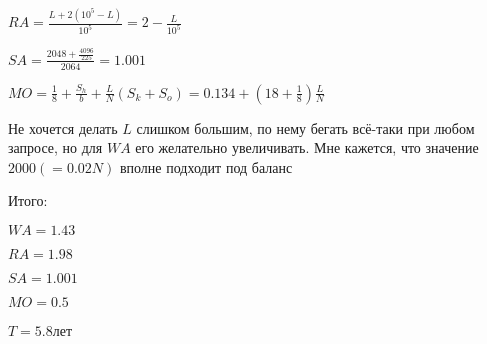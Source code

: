 \large$RA = \frac{L + 2(10^5-L)}{10^5} = 2 - \frac{L}{10^5}$\normalsize

\large$SA = \frac{2048 + \frac{4096}{225}}{2064} = 1.001$\normalsize

\large$MO = \frac{1}{8} + \frac{S_h}{b} + \frac{L}{N}(S_k + S_o) = 0.134 + (18+\frac{1}{8})\frac{L}{N}$\normalsize

Не хочется делать $L$ слишком большим, по нему бегать всё-таки при любом запросе, но для $WA$ его желательно увеличивать. Мне кажется, что значение $2000 (=0.02N)$ вполне подходит под баланс

Итого:

\large$WA = 1.43$\normalsize

\large$RA = 1.98$\normalsize

\large$SA = 1.001$\normalsize

\large$MO = 0.5$\normalsize

\large$T = 5.8$\normalsize лет